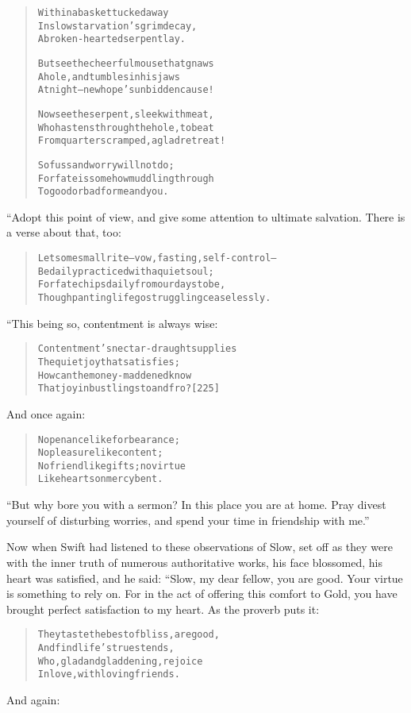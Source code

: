 \documentclass[article, twoside, 14pt]{memoir}
\renewenvironment{verbatim}{%
\begin{quote}%
\vskip -10pt%
\begin{alltt}\normalfont\large}{\end{alltt}%
\end{quote}%
\vskip -10pt
} %
\begin{document}
\begin{verbatim}
Within a basket tucked away
In slow starvation's grim decay,
A broken-hearted serpent lay.

But see the cheerful mouse that gnaws
A hole, and tumbles in his jaws
At night--new hope's unbidden cause!

Now see the serpent, sleek with meat,
Who hastens through the hole, to beat
From quarters cramped, a glad retreat!

So fuss and worry will not do;
For fate is somehow muddling through
To good or bad for me and you.
\end{verbatim}
“Adopt this point of view, and give some attention to ultimate
salvation. There is a verse about that, too:

\begin{verbatim}
Let some small rite--vow, fasting, self-control--
Be daily practiced with a quiet soul;
For fate chips daily from our days to be,
Though panting life go struggling ceaselessly.
\end{verbatim}
“This being so, contentment is always wise:

\begin{verbatim}
Contentment's nectar-draught supplies
The quiet joy that satisfies;
How can the money-maddened know
That joy in bustlings to and fro?                       [225]
\end{verbatim}
And once again:

\begin{verbatim}
No penance like forbearance;
    No pleasure like content;
No friend like gifts; no virtue
    Like hearts on mercy bent.
\end{verbatim}
``But why bore you with a sermon? In this place you are at home. Pray divest yourself of disturbing worries, and spend your time in friendship with me.''

Now when Swift had listened to these observations of Slow, set off
as they were with the inner truth of numerous authoritative works,
his face blossomed, his heart was satisfied, and he said: “Slow, my
dear fellow, you are good. Your virtue is something to rely on. For
in the act of offering this comfort to Gold, you have brought
perfect satisfaction to my heart. As the proverb puts it:

\begin{verbatim}
They taste the best of bliss, are good,
    And find life's truest ends,
Who, glad and gladdening, rejoice
    In love, with loving friends.
\end{verbatim}
And again:
\end{document}
